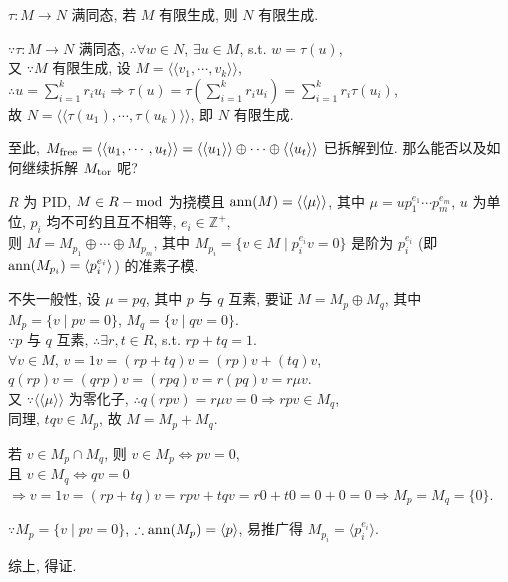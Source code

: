 \documentclass{note}
\begin{document}
\begin{cor}\label{cor-1 for thm-6.8}
    $\tau:M\rightarrow N$ 满同态, 若 $M$ 有限生成, 则 $N$ 有限生成.
\end{cor}
\begin{pf}
    $\because\tau:M\rightarrow N$ 满同态, $\therefore\forall w\in N$, $\exists u\in M$, s.t. $w=\tau(u)$,\\
    又 $\because M$ 有限生成, 设 $M=\langle\langle v_1,\cdots,v_k\rangle\rangle$, $\therefore u=\sum_{i=1}^kr_iu_i\Longrightarrow\tau(u)=\tau\left(\sum_{i=1}^kr_iu_i\right)=\sum_{i=1}^kr_i\tau(u_i)$,\\
    故 $N=\langle\langle\tau(u_1),\cdots,\tau(u_k)\rangle\rangle$, 即 $N$ 有限生成.
\end{pf}

至此, $M_{\operatorname{free}}=\langle\langle u_1,\cdots,u_t\rangle\rangle=\langle\langle u_1\rangle\rangle\oplus\cdots\oplus\langle\langle u_t\rangle\rangle$ 已拆解到位. 那么能否以及如何继续拆解 $M_{\operatorname{tor}}$ 呢?

\begin{thm}[(课本定理 6.10)]\label{thm-6.10}
    $R$ 为 PID, $M\in R-\operatorname{mod}$ 为挠模且 $\operatorname{ann}(M)=\langle\langle\mu\rangle\rangle$, 其中 $\mu=up_1^{e_1}\cdots p_m^{e_m}$, $u$ 为单位, $p_i$ 均不可约且互不相等, $e_i\in\mathbb{Z}^+$,\\
    则 $M=M_{p_1}\oplus\cdots\oplus M_{p_m}$, 其中 $M_{p_i}=\{v\in M\mid p_i^{e_i}v=0\}$ 是阶为 $p_i^{e_i}$ (即 $\operatorname{ann}(M_{p_i})=\langle p_i^{e_i}\rangle$) 的准素子模.
\end{thm}
\begin{pf}
    不失一般性, 设 $\mu=pq$, 其中 $p$ 与 $q$ 互素, 要证 $M=M_p\oplus M_q$, 其中 $M_p=\{v\mid pv=0\}$, $M_q=\{v\mid qv=0\}$.\\
    $\because p$ 与 $q$ 互素, $\therefore\exists r,t\in R$, s.t. $rp+tq=1$.\\
    $\forall v\in M$, $v=1v=(rp+tq)v=(rp)v+(tq)v$,\\
    $q(rp)v=(qrp)v=(rpq)v=r(pq)v=r\mu v$.\\
    又 $\because\langle\langle\mu\rangle\rangle$ 为零化子, $\therefore q(rpv)=r\mu v=0\Longrightarrow rpv\in M_q$,\\
    同理, $tqv\in M_p$, 故 $M=M_p+M_q$.

    若 $v\in M_p\cap M_q$, 则 $v\in M_p\Longleftrightarrow pv=0$,\\
    且 $v\in M_q\Longleftrightarrow qv=0$\\
    $\Longrightarrow v=1v=(rp+tq)v=rpv+tqv=r0+t0=0+0=0\Longrightarrow M_p=M_q=\{0\}$.

    $\because M_p=\{v\mid pv=0\}$, $\therefore\operatorname{ann}(M_{p})=\langle p\rangle$, 易推广得 $M_{p_i}=\langle p_i^{e_i}\rangle$.

    综上, 得证.
\end{pf}
\end{document}
